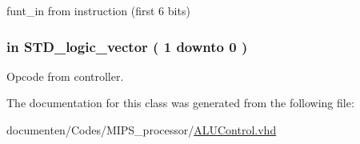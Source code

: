 funt\-\_\-in from instruction (first 6 bits) 

\hypertarget{class_a_l_u___control_ab6a5d61e888c23ba77524db9a1b57d00}{
\subsubsection[{A\-L\-U\-\_\-\-O\-P}]{ {\bfseries \textcolor{vhdlkeyword}{in}\textcolor{vhdlchar}{ }} {\bfseries \textcolor{comment}{S\-T\-D\-\_\-logic\-\_\-vector}\textcolor{vhdlchar}{ }\textcolor{vhdlchar}{(}\textcolor{vhdlchar}{ }\textcolor{vhdlchar}{ } \textcolor{vhdldigit}{1} \textcolor{vhdlchar}{ }\textcolor{vhdlchar}{ }\textcolor{vhdlchar}{ }\textcolor{vhdlkeyword}{downto}\textcolor{vhdlchar}{ }\textcolor{vhdlchar}{ }\textcolor{vhdlchar}{ } \textcolor{vhdldigit}{0} \textcolor{vhdlchar}{ }\textcolor{vhdlchar}{)}\textcolor{vhdlchar}{ }} \hspace{0.3cm}{\ttfamily [Port]}}}\label{class_a_l_u___control_ab6a5d61e888c23ba77524db9a1b57d00}


Opcode from controller. 



The documentation for this class was generated from the following file\-:\begin{DoxyCompactItemize}
\item 
documenten/\-Codes/\-M\-I\-P\-S\-\_\-processor/\hyperlink{_a_l_u_control_8vhd}{A\-L\-U\-Control.\-vhd}\end{DoxyCompactItemize}
